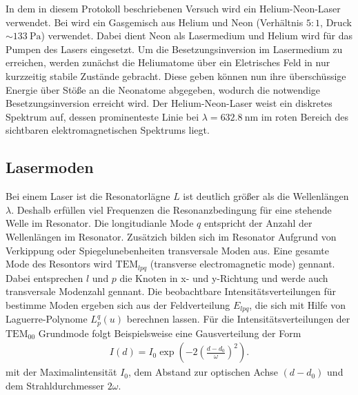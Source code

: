 In dem in diesem Protokoll beschriebenen
Versuch wird ein Helium-Neon-Laser verwendet.
Bei wird ein Gasgemisch aus Helium und
Neon (Verhältnis $5:1$, Druck $\sim \SI{133}{\pascal}$) verwendet.
Dabei dient Neon als Lasermedium und Helium wird für das Pumpen
des Lasers eingesetzt. Um die Besetzungsinversion im Lasermedium
zu erreichen, werden zunächst die Heliumatome über ein
Eletrisches Feld in nur kurzzeitig stabile Zustände gebracht.
Diese geben können nun ihre
überschüssige Energie über Stöße an die Neonatome abgegeben,
wodurch die notwendige Besetzungsinversion erreicht wird.
Der Helium-Neon-Laser weist ein diskretes Spektrum auf, dessen
prominenteste Linie bei $\lambda = \SI{632.8}{\nano\meter}$ im
roten Bereich des sichtbaren elektromagnetischen Spektrums liegt.






\subsection{Lasermoden}
\label{subsec:lasermoden}
Bei einem Laser ist die
Resonatorlägne $L$ ist deutlich größer
als die Wellenlängen $\lambda$. Deshalb erfüllen viel Frequenzen
die Resonanzbedingung für eine stehende Welle im Resonator.
Die longitudianle Mode $q$ entspricht der Anzahl der Wellenlängen
im Resonator. Zusätzich bilden sich im Resonator
Aufgrund von Verkippung oder Spiegelunebenheiten
transversale Moden aus.
Eine gesamte Mode des Resontors wird
$\text{TEM}_{lpq}$ (transverse electromagnetic mode)
gennant. Dabei entsprechen $l$ und $p$ die Knoten in
x- und y-Richtung und werde auch
transversale Modenzahl gennant.
Die beobachtbare Intensitätsverteilungen für bestimme Moden
ergeben sich aus der Feldverteilung $E_{lpq}$, die
sich mit Hilfe von Laguerre-Polynome $L_p^q(u)$
berechnen lassen. Für
die Intensitätsverteilungen der $\text{TEM}_{00}$ Grundmode folgt Beispielsweise
eine Gausverteilung der Form
\begin{align}
I(d)=I_0\exp\left(-2\left(\frac{d-d_0}{\omega}\right)^2\right).
\end{align}
mit der Maximalintensität $I_0$, dem Abstand zur optischen Achse $(d-d_0)$
und dem Strahldurchmesser $2\omega$.
